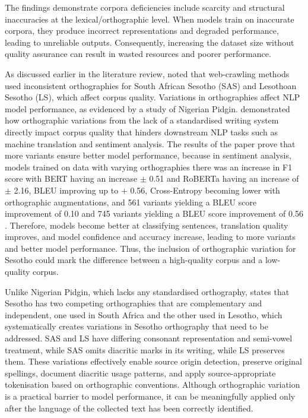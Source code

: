 \documentclass[11pt,a4paper]{article}
\begin{document}
The findings demonstrate corpora deficiencies include scarcity and structural inaccuracies at the lexical/orthographic level. When models train on inaccurate corpora, they produce incorrect representations and degraded performance, leading to unreliable outputs. Consequently, increasing the dataset size without quality assurance can result in wasted resources and poorer performance. 
\vspace{2em}

As discussed earlier in the literature review, \citet{Sibeko2024} noted that web-crawling methods used inconsistent orthographies for South African Sesotho (SAS) and Lesothoan Sesotho (LS), which affect corpus quality. Variations in orthographies affect NLP model performance, as evidenced by a study of Nigerian Pidgin. \citet{lin-etal-2024-modeling} demonstrated how orthographic variations from the lack of a standardised writing system directly impact corpus quality that hinders downstream NLP tasks such as machine translation and sentiment analysis. The results of the paper prove that more variants ensure better model performance, because in sentiment analysis, models trained on data with varying orthographies there was an increase in F1 score with BERT having an increase  $\pm$ 0.51 and RoBERTa having an increase of $\pm$ 2.16, BLEU improving up to $+$ 0.56, Cross-Entropy becoming lower with orthographic augmentations, and 561 variants yielding a BLEU score improvement of  0.10 and 745 variants yielding a BLEU score improvement of 0.56 \citep{lin-etal-2024-modeling}. Therefore, models become better at classifying sentences, translation quality improves, and model confidence and accuracy increase, leading to more variants and better model performance. Thus, the inclusion of orthographic variation for Sesotho could mark the difference between a high-quality corpus and a low-quality corpus. 

Unlike Nigerian Pidgin, which lacks any standardised orthography, \citet{Makutoane2022} states that Sesotho has two competing orthographies that are complementary and independent, one used in South Africa and the other used in Lesotho, which systematically creates variations in Sesotho orthography that need to be addressed. SAS and LS have differing consonant representation and semi-vowel treatment, while SAS omits diacritic marks in its writing, while LS preserves them. These variations effectively enable source origin detection, preserve original spellings, document diacritic usage patterns, and apply source-appropriate tokenisation based on orthographic conventions. Although orthographic variation is a practical barrier to model performance, it can be meaningfully applied only after the language of the collected text has been correctly identified. 
\vspace{2em}
\end{document}
